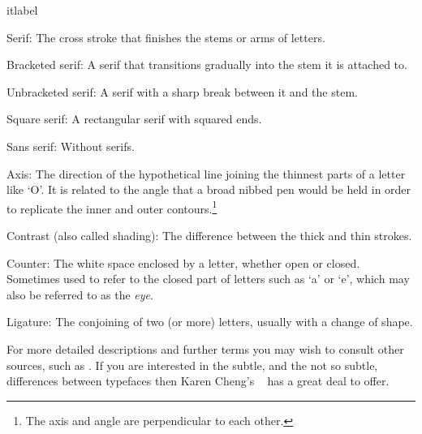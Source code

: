 \documentclass[10pt,a4paper,extrafontsizes]{memoir}
\begin{document}
\begin{paracol}{2}
\switchEng
\begin{labelled}{itlabel}
\item[Serif:] The cross stroke that finishes the stems or arms of letters.
\item[Bracketed serif:] A serif that transitions gradually into 
     the stem it is attached to.
\item[Unbracketed serif:] A serif with a sharp break between 
      it and the stem.
\item[Square serif:] A rectangular serif with squared ends.
\item[Sans serif:] Without serifs.
\item[Axis:] The direction of the hypothetical line joining the thinnest 
             parts of a letter like `O'. It is related to the angle that
             a broad nibbed pen would be held in order to replicate the
             inner and outer contours.\footnote{The axis and angle are 
             perpendicular to each other.}
\item[Contrast (also called shading):] The 
              difference between the thick and thin strokes.
\item[Counter:] The white space enclosed by a letter, 
                whether open or closed.
                Sometimes used to refer to the closed part of letters such
                as `a' or `e', which may also be referred to as the 
               \textit{eye}.
\item[Ligature:] The conjoining of two (or more) letters, 
                 usually with a change of shape.
\end{labelled}


For more detailed descriptions and further terms
you may wish to consult other sources, such as 
\autocite{BRINGHURST99,LAWSONAGNER90,MEGGS00}. If you are interested in the
subtle, and the not so subtle, differences between typefaces then Karen 
Cheng's ~\autocite{CHENG05} has a great deal to offer.


\end{paracol}
\end{document}
